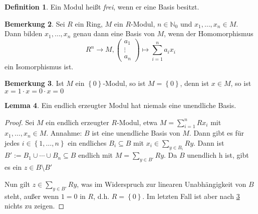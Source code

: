 \documentclass[
twoside=semi,
fontsize=12,
DIV=12, 
cleardoublepage=current,
leqno,
headings=optiontoheadandtoc, 
toc=idx
]{scrbook}
\newcommand{\N}{\mathbb{N}}
\newcommand{\set}[1]{\left\{ #1 \right\}}
\theoremstyle{definition}
\newtheorem{definition}{Definition}[section]
\newtheorem{bemerkung}[definition]{Bemerkung}
\newtheorem{lemma}[definition]{Lemma}
\begin{document}
	\begin{definition}\label{1.2.6}\hfill\newline
		Ein Modul hei\ss t \emph{frei}, wenn er eine Basis besitzt.
	\end{definition}

	\begin{bemerkung}\label{1.2.7}\hfill\newline
		Sei $R$ ein Ring, $M$ ein $R$-Modul, $n \in \N_0$ und $x_1, \dots, x_n \in M$. Dann bilden $x_1, \dots, x_n$ genau dann eine Basis von $M$, wenn der Homomorphismus 
		\[R^n \to M, \begin{pmatrix}
			a_1\\\vdots\\a_n
		\end{pmatrix} \mapsto \sum_{i=1}^n a_ix_i\] ein Isomorphismus ist.
	\end{bemerkung}
	
	\begin{bemerkung}\label{1.2.8}\hfill\newline
		Ist $M$ ein $\set{0}$-Modul, so ist $M = \set{0}$, denn ist $x \in M$, so ist $x=1 \cdot x = 0 \cdot x = 0$
	\end{bemerkung}

	\begin{lemma}\label{1.2.9}\hfill\newline
		Ein endlich erzeugter Modul hat niemals eine unendliche Basis.
		
		\begin{proof}
			Sei $M$ ein endlich erzeugter $R$-Modul, etwa $\displaystyle M = \sum_{i=1}^n Rx_i$ mit $x_1, \dots, x_n \in M$. \newline
			Annahme: $B$ ist eine unendliche Basis von $M$. Dann gibt es f\"ur jedes $i \in \set{1, \dots, n}$ ein endliches $B_i \subseteq B$ mit $\displaystyle x_i \in \sum_{y \in B_i}Ry$. Dann ist $B' := B_1 \cup \cdots \cup B_n \subseteq B$ endlich mit $\displaystyle M = \sum_{y \in B'}Ry$. Da $B$ unendlich h ist, gibt es ein $z \in B\setminus B'$
			
			Nun gilt $\displaystyle z \in \sum_{y \in B'}Ry$, was im Widerspruch zur linearen Unabh\"angigkeit von $B$ steht, au\ss er wenn $1 = 0$ in $R$, d.h. $R = \set{0}$. Im letzten Fall ist aber nach \ref{1.2.8} nichts zu zeigen.
		\end{proof}
	\end{lemma}
\end{document}
